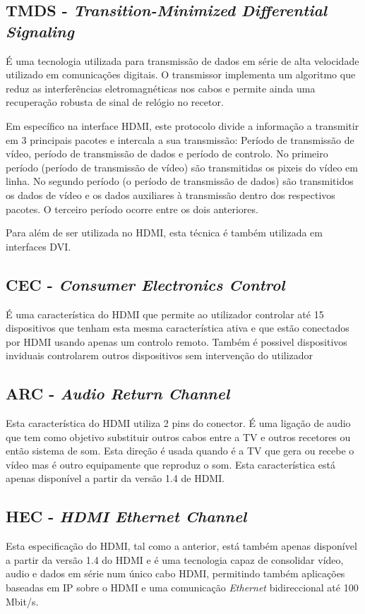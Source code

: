 \subsection{TMDS - \textit{Transition-Minimized Differential Signaling} } \label{subsec:TMDS} 
É uma tecnologia utilizada para transmissão de dados em série de alta velocidade utilizado em comunicações digitais. O transmissor implementa um algoritmo que reduz as interferências eletromagnéticas nos cabos e permite ainda uma recuperação robusta de sinal de relógio no recetor. 

Em específico na interface HDMI, este protocolo divide a informação a transmitir em 3 principais pacotes e intercala a sua transmissão: Período de transmissão de vídeo, período de transmissão de dados e período de controlo. No primeiro período (período de transmissão de vídeo) são transmitidas os pixeis do vídeo em linha. No segundo período (o período de transmissão de dados) são transmitidos os dados de vídeo e os dados auxiliares à transmissão dentro dos respectivos pacotes. O terceiro período ocorre entre os dois anteriores. 

Para além de ser utilizada no HDMI, esta técnica é também utilizada em interfaces DVI.

\subsection{CEC - \textit{Consumer Electronics Control} } \label{subsec:CEC} 
É uma característica do HDMI que permite ao utilizador controlar até 15 dispositivos que tenham esta mesma característica ativa e que estão conectados por HDMI usando apenas um controlo remoto. Também é possivel dispositivos inviduais controlarem outros dispositivos sem intervenção do utilizador

\subsection{ARC - \textit{Audio Return Channel}  } \label{subsec:ARC} 
Esta característica do HDMI utiliza 2 pins do conector. É uma ligação de audio que tem como objetivo substituir outros cabos entre a TV e outros recetores ou então sistema de som. Esta direção é usada quando é a TV que gera ou recebe o vídeo mas é outro equipamente que reproduz o som. Esta característica está apenas disponível a partir da versão 1.4 de HDMI.

\subsection{HEC - \textit{HDMI Ethernet Channel}  } \label{subsec:HEC} 
Esta especificação do HDMI, tal como a anterior, está também apenas disponível a partir da versão 1.4 do HDMI e é uma tecnologia capaz de consolidar vídeo, audio e dados em série num único cabo HDMI, permitindo também aplicações baseadas em IP sobre o HDMI e uma comunicação \textit{Ethernet} bidireccional até 100 Mbit/s.

